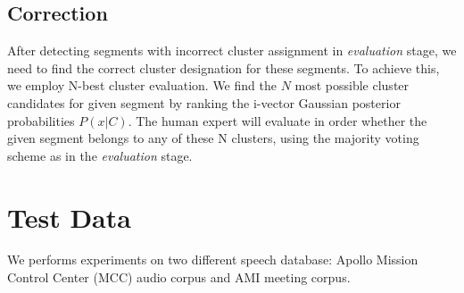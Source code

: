 \documentclass[journal]{IEEEtran}
\begin{document}
\subsection{Correction}
After detecting segments with incorrect cluster assignment in \textit{evaluation} stage, we need to find the correct cluster designation for these segments. To achieve this, we employ N-best cluster evaluation.
We find the $N$ most possible cluster candidates for given segment by ranking the i-vector Gaussian posterior probabilities $P(x|C)$. The human expert will evaluate in order whether the given segment belongs to any of these N clusters, using the majority voting scheme as in the \textit{evaluation} stage. 

\section{Test Data}
We performs experiments on two different speech database: Apollo Mission Control Center (MCC) audio  corpus and AMI meeting corpus. 
\end{document}

